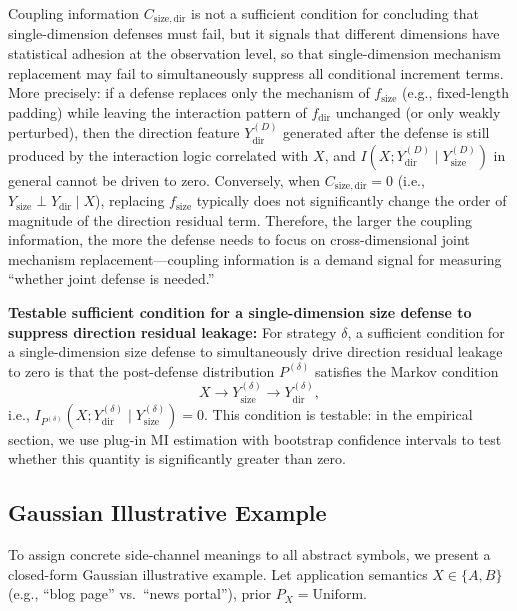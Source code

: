 \documentclass[lettersize,journal]{IEEEtran}
\begin{document}
Coupling information $C_{\mathrm{size,dir}}$ is not a sufficient condition
for concluding that single-dimension defenses must fail, but it signals
that different dimensions have statistical adhesion at the observation level,
so that single-dimension mechanism replacement may fail to simultaneously
suppress all conditional increment terms.
More precisely: if a defense replaces only the mechanism of $f_{\mathrm{size}}$
(e.g., fixed-length padding) while leaving the interaction pattern of
$f_{\mathrm{dir}}$ unchanged (or only weakly perturbed), then the
direction feature $Y^{(D)}_{\mathrm{dir}}$ generated after the defense is
still produced by the interaction logic correlated with $X$, and
$I(X;Y^{(D)}_{\mathrm{dir}}\mid Y^{(D)}_{\mathrm{size}})$ in general
cannot be driven to zero.
Conversely, when $C_{\mathrm{size,dir}}=0$ (i.e.,
$Y_{\mathrm{size}}\perp Y_{\mathrm{dir}}\mid X$), replacing $f_{\mathrm{size}}$
typically does not significantly change the order of magnitude of the
direction residual term.
Therefore, the larger the coupling information, the more the defense needs
to focus on cross-dimensional joint mechanism replacement---coupling
information is a demand signal for measuring ``whether joint defense is
needed.''

\textbf{Testable sufficient condition for a single-dimension size defense to
suppress direction residual leakage:}
For strategy $\delta$, a sufficient condition for a single-dimension size
defense to simultaneously drive direction residual leakage to zero is that
the post-defense distribution $P^{(\delta)}$ satisfies the Markov condition
\[
X \to Y^{(\delta)}_{\mathrm{size}} \to Y^{(\delta)}_{\mathrm{dir}},
\]
i.e., $I_{P^{(\delta)}}(X;Y^{(\delta)}_{\mathrm{dir}}\mid Y^{(\delta)}_{\mathrm{size}})=0$.
This condition is testable: in the empirical section, we use plug-in MI
estimation with bootstrap confidence intervals to test whether this quantity
is significantly greater than zero.

\subsection{Gaussian Illustrative Example}\label{sec:toy}

To assign concrete side-channel meanings to all abstract symbols, we
present a closed-form Gaussian illustrative example.
Let application semantics $X\in\{A,B\}$ (e.g., ``blog page'' vs.\ ``news
portal''), prior $P_X=\mathrm{Uniform}$.
\end{document}
